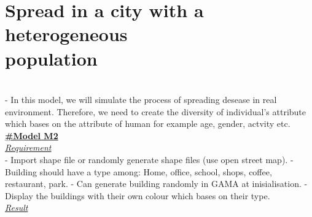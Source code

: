 \documentclass{article}
\begin{document}
\section{Spread in a city with a heterogeneous \\population}
\\- In this model, we will simulate the process of spreading desease in real environment. Therefore, we need to create the diversity of individual's attribute which bases on the attribute of human for example age, gender, actvity etc.
\\
\underline{\textbf{#Model M2}}
\\
\underline{\emph{Requirement}}
\\
- Import shape file or randomly generate shape files (use open street map).
- Building should have a type among: Home, office, school, shops, coffee, restaurant, park.
- Can generate building randomly in GAMA at inisialisation.
- Display the buildings with their own colour which bases on their type.
\\
\underline{\emph{Result}}\\
\end{document}

